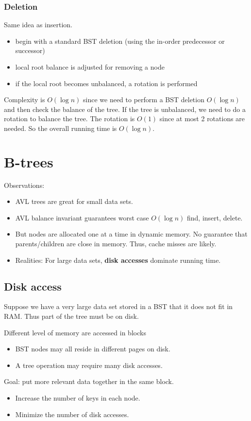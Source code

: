\documentclass[letterpaper,12pt]{article}
\begin{document}
\subsubsection{Deletion}
Same idea as insertion. \begin{itemize}
    \item begin with a standard BST deletion (using the in-order predecessor or successor)
    \item local root balance is adjusted for removing a node
    \item if the local root becomes unbalanced, a rotation is performed
\end{itemize}
Complexity is $O(\log n)$ since we need to perform a BST deletion $O(\log n)$ and then check the balance of the tree. If the tree is unbalanced, we need to do a rotation to balance the tree. The rotation is $O(1)$ since at most 2 rotations are needed. So the overall running time is $O(\log n)$.

\section{B-trees}
Observations: \begin{itemize}
    \item AVL trees are great for small data sets.
    \item AVL balance invariant guarantees worst case $O(\log n)$ find, insert, delete.
    \item But nodes are allocated one at a time in dynamic memory. No guarantee that parents/children are close in memory. Thus, cache misses are likely.
    \item Realities: For large data sets, \textbf{disk accesses} dominate running time.
\end{itemize}
\subsection{Disk access}
Suppose we have a very large data set stored in a BST that it does not fit in RAM. Thus part of the tree must be on disk. 

Different level of memory are accessed in blocks\begin{itemize}
    \item BST nodes may all reside in different pages on disk.
    \item A tree operation may require many disk accesses.
\end{itemize}

Goal: put more relevant data together in the same block.\begin{itemize}
    \item Increase the number of keys in each node.
    \item Minimize the number of disk accesses.
\end{itemize}
\end{document}

